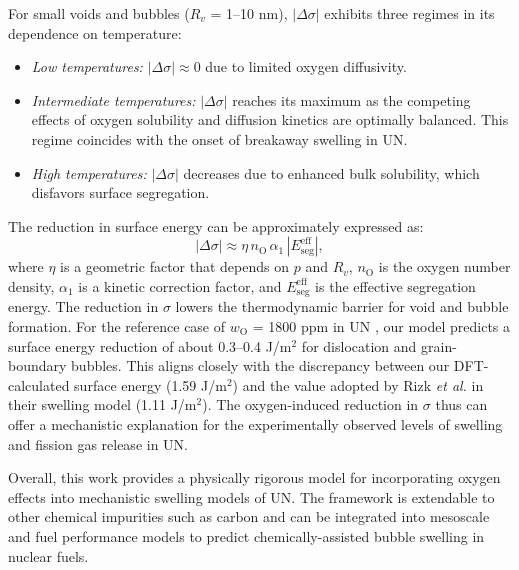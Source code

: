 \documentclass[preprint,12pt,sort&compress]{elsarticle}
\newcommand{\?}{\stackrel{?}{=}}
\begin{document}
\vspace{0.5cm}

For small voids and bubbles ($R_v$ = 1--10 nm), $|\Delta \sigma|$ exhibits three regimes in its dependence on temperature:
    \begin{itemize}
    \item \textit{Low temperatures:} $|\Delta \sigma| \approx 0$ due to limited oxygen diffusivity.
    \item \textit{Intermediate temperatures:} $|\Delta \sigma|$ reaches its maximum as the competing effects of oxygen solubility and diffusion kinetics are optimally balanced. This regime coincides with the onset of breakaway swelling in UN.
    \item \textit{High temperatures:} $|\Delta \sigma|$ decreases due to enhanced bulk solubility, which disfavors surface segregation.
    \end{itemize}

The reduction in surface energy can be approximately expressed as:
\[
|\Delta \sigma| \approx \eta \, n_\text{O} \, \alpha_1 \, |E_\text{seg}^\text{eff}|,
\]
where $\eta$ is a geometric factor that depends on $p$ and $R_v$, $n_\text{O}$ is the oxygen number density, $\alpha_1$ is a kinetic correction factor, and $E_\text{seg}^\text{eff}$ is the effective segregation energy. The reduction in $\sigma$ lowers the thermodynamic barrier for void and bubble formation. For the reference case of $w_\text{O}$ = 1800 ppm in UN \cite{Ronchi1975}, our model predicts a surface energy reduction of about 0.3--0.4 J/m$^2$ for dislocation and grain-boundary bubbles. This aligns closely with the discrepancy between our DFT-calculated surface energy (1.59 J/m$^2$) and the value adopted by Rizk \textit{et al.} \cite{Rizk2025} in their swelling model (1.11 J/m$^2$). The oxygen-induced reduction in $\sigma$ thus can offer a mechanistic explanation for the experimentally observed levels of swelling and fission gas release in UN. %

Overall, this work provides a physically rigorous model for incorporating oxygen effects into mechanistic swelling models of UN. The framework is extendable to other chemical impurities such as carbon and can be integrated into mesoscale and fuel performance models to predict chemically-assisted bubble swelling in nuclear fuels.
\end{document}
